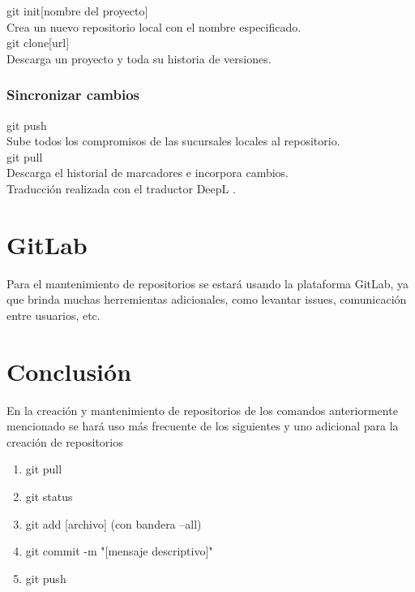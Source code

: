 \documentclass[]{article}
\begin{document}
 git init[nombre del proyecto]\\
 Crea un nuevo repositorio local con el nombre especificado.\\[0.5cm]

 git clone[url]\\
 Descarga un proyecto y toda su historia de versiones.\\[0.5cm]
 
 
 \subsubsection{Sincronizar cambios}
 
 git push\\
Sube todos los compromisos de las sucursales locales al repositorio.\\[0.5cm]

 git pull\\
 Descarga el historial de marcadores e incorpora cambios.\\[0.5cm]
 
 
  \cite{GitIntro}Traducción realizada con el traductor DeepL \cite{DeepL}.\\

\section{GitLab}

Para el mantenimiento de repositorios se estará usando la plataforma GitLab, ya que brinda muchas herremientas adicionales, como levantar issues, comunicación entre usuarios, etc.\\

\section{Conclusión}

En la creación y mantenimiento de repositorios de los comandos anteriormente mencionado se hará uso más frecuente de los siguientes y uno adicional para la creación de repositorios \\

\begin{enumerate}
    \item git pull
	\item git status
	\item git add [archivo] (con bandera --all)
	\item git commit -m "[mensaje descriptivo]"
	\item git push
\end{enumerate}







\end{document}
